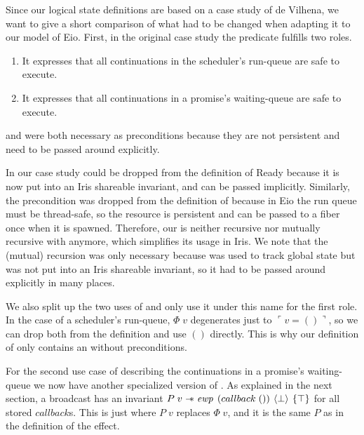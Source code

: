 Since our logical state definitions are based on a case study of de Vilhena, we want to give a short comparison of what had to be changed when adapting it to our model of Eio.
First, in the original case study the \gsReady{} predicate fulfills two roles.
\begin{enumerate}
  \item It expresses that all continuations in the scheduler's run-queue are safe to execute.
  \item It expresses that all continuations in a promise's waiting-queue are safe to execute.
\end{enumerate}

\gsPInv{} and \gsIsQueue{} were both necessary as preconditions because they are not persistent and need to be passed around explicitly.

In our case study \gsPInv{} could be dropped from the definition of Ready because it is now put into an Iris shareable invariant, and can be passed implicitly.
Similarly, the \gsIsQueue{} precondition was dropped from the definition of \gsReady{} because in Eio the run queue must be thread-safe, so the \gsIsQueue{} resource is persistent and can be passed to a fiber once when it is spawned.
Therefore, our \gsReady{} is neither recursive nor mutually recursive with \gsPInv{} anymore, which simplifies its usage in Iris.
We note that the (mutual) recursion was only necessary because \gsPInv{} was used to track global state but was not put into an Iris shareable invariant, so it had to be passed around explicitly in many places.

We also split up the two uses of \gsReady{} and only use it under this name for the first role.
In the case of a scheduler's run-queue, \(Φ\; v\) degenerates just to \(\ulcorner v = () \urcorner\), so we can drop both from the definition and use \(()\) directly.
This is why our definition of \gsReady{} only contains an \ewpt{} without preconditions.

For the second use case of describing the continuations in a promise's waiting-queue we now have another specialized version of \gsReady{}.
As explained in the next section, a broadcast has an invariant \(P\; v \wand \ewp{callback\; ()}{\bot}{\top}\) for all stored \(callback\)s.
This is just \gsReady{} where \(P\; v\) replaces \(Φ\; v\), and it is the same \(P\) as in the definition of the \esuspend{} effect.
